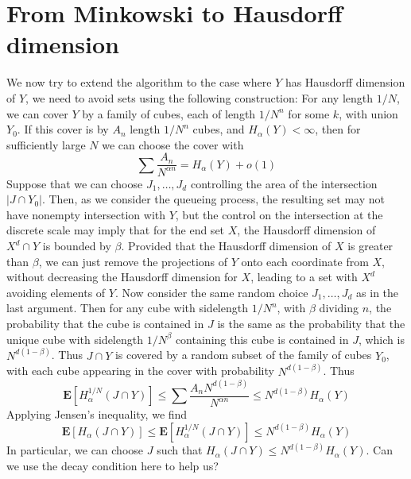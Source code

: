 \documentclass{report}
\theoremstyle{plain}
\theoremstyle{plain}
\begin{document}
\section{From Minkowski to Hausdorff dimension}

We now try to extend the algorithm to the case where $Y$ has Hausdorff dimension of $Y$, we need to avoid sets using the following construction: For any length $1/N$, we can cover $Y$ by a family of cubes, each of length $1/N^n$ for some $k$, with union $Y_0$. If this cover is by $A_n$ length $1/N^n$ cubes, and $H_\alpha(Y) < \infty$, then for sufficiently large $N$ we can choose the cover with
%
\[ \sum \frac{A_n}{N^{\alpha n}} = H_\alpha(Y) + o(1) \]
%
Suppose that we can choose $J_1, \dots, J_d$ controlling the area of the intersection $|J \cap Y_0|$. Then, as we consider the queueing process, the resulting set may not have nonempty intersection with $Y$, but the control on the intersection at the discrete scale may imply that for the end set $X$, the Hausdorff dimension of $X^d \cap Y$ is bounded by $\beta$. Provided that the Hausdorff dimension of $X$ is greater than $\beta$, we can just remove the projections of $Y$ onto each coordinate from $X$, without decreasing the Hausdorff dimension for $X$, leading to a set with $X^d$ avoiding elements of $Y$. Now consider the same random choice $J_1, \dots, J_d$ as in the last argument. Then for any cube with sidelength $1/N^n$, with $\beta$ dividing $n$, the probability that the cube is contained in $J$ is the same as the probability that the unique cube with sidelength $1/N^\beta$ containing this cube is contained in $J$, which is $N^{d(1 - \beta)}$. Thus $J \cap Y$ is covered by a random subset of the family of cubes $Y_0$, with each cube appearing in the cover with probability $N^{d(1 - \beta)}$. Thus
%
\[ \mathbf{E}[H_\alpha^{1/N}(J \cap Y)] \leq \sum \frac{A_n N^{d(1 - \beta)}}{N^{\alpha n}} \leq N^{d(1 - \beta)} H_\alpha(Y) \]
%
Applying Jensen's inequality, we find
%
\[ \mathbf{E}[H_\alpha(J \cap Y)] \leq \mathbf{E}[H_\alpha^{1/N}(J \cap Y)] \leq N^{d(1-\beta)} H_\alpha(Y) \]
%
In particular, we can choose $J$ such that $H_\alpha(J \cap Y) \leq N^{d(1-\beta)} H_\alpha(Y)$. Can we use the decay condition here to help us?
\end{document}
